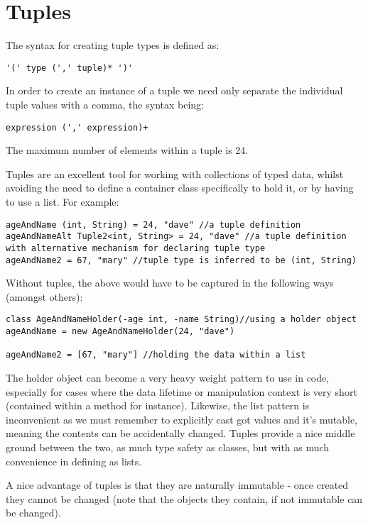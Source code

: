 \documentclass[conc-doc]{subfiles}
\begin{document}
	
	\chapter[Tuples]{Tuples}
	\label{chap:tuples}
The syntax for creating tuple types is defined as:
\begin{center}
	\lstinline{'(' type (',' tuple)* ')'}
\end{center}

In order to create an instance of a tuple we need only separate the individual tuple values with a comma, the syntax being:
\begin{center}
	\lstinline{expression (',' expression)+}
\end{center}

The maximum number of elements within a tuple is 24.

Tuples are an excellent tool for working with collections of typed data, whilst avoiding the need to define a container class specifically to hold it, or by having to use a list. For example:
\begin{lstlisting}
ageAndName (int, String) = 24, "dave" //a tuple definition
ageAndNameAlt Tuple2<int, String> = 24, "dave" //a tuple definition with alternative mechanism for declaring tuple type
ageAndName2 = 67, "mary" //tuple type is inferred to be (int, String)
\end{lstlisting}

Without tuples, the above would have to be captured in the following ways (amongst others):
\begin{lstlisting}
class AgeAndNameHolder(-age int, -name String)//using a holder object
ageAndName = new AgeAndNameHolder(24, "dave")

ageAndName2 = [67, "mary"] //holding the data within a list
\end{lstlisting}

The holder object can become a very heavy weight pattern to use in code, especially for cases where the data lifetime or manipulation context is very short (contained within a method for instance). Likewise, the list pattern is inconvenient as we must remember to explicitly cast got values and it’s mutable, meaning the contents can be accidentally changed. Tuples provide a nice middle ground between the two, as much type safety as classes, but with as much convenience in defining as lists.

A nice advantage of tuples is that they are naturally immutable - once created they cannot be changed (note that the objects they contain, if not immutable can be changed).
\end{document}
